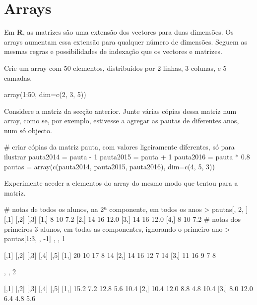\documentclass{exam}
\begin{document}
\section{Arrays}
Em \textbf{R}, as matrizes são uma extensão dos vectores para duas dimensões. Os arrays aumentam essa extensão para qualquer número de dimensões. Seguem as mesmas regras e possibilidades de indexação que os vectores e matrizes.

\begin{questions}
\question Crie um array com 50 elementos, distribuídos por 2 linhas, 3 colunas, e 5 camadas.

\begin{solution}
	\begin{rcode}
		array(1:50, dim=c(2, 3, 5))
	\end{rcode}
\end{solution}


\question Considere a matriz  da secção anterior. Junte várias cópias dessa matriz num array, como se, por exemplo, estivesse a agregar as pautas de diferentes anos, num só objecto.

\begin{solution}
	\begin{rcode}
		# criar cópias da matriz pauta, com valores ligeiramente diferentes, só para ilustrar
		pauta2014 = pauta - 1
		pauta2015 = pauta + 1
		pauta2016 = pauta * 0.8
		pautas = array(c(pauta2014, pauta2015, pauta2016), dim=c(4, 5, 3))
	\end{rcode}
\end{solution}

\question Experimente aceder a elementos do array do mesmo modo que tentou para a matriz.

\begin{solution}
	\begin{rcode}
		# notas de todos os alunos, na 2ª componente, em todos os anos
		> pautas[, 2, ]
		[,1] [,2] [,3]
		[1,]    8   10  7.2
		[2,]   14   16 12.0
		[3,]   14   16 12.0
		[4,]    8   10  7.2
		# notas dos primeiros 3 alunos, em todas as componentes, ignorando o primeiro ano
		> pautas[1:3, , -1]
		, , 1
		
		[,1] [,2] [,3] [,4] [,5]
		[1,]   20   10   17    8   14
		[2,]   14   16   12    7   14
		[3,]   11   16    9    7    8
		
		, , 2
		
		[,1] [,2] [,3] [,4] [,5]
		[1,] 15.2  7.2 12.8  5.6 10.4
		[2,] 10.4 12.0  8.8  4.8 10.4
		[3,]  8.0 12.0  6.4  4.8  5.6
	\end{rcode}
\end{solution}

\end{questions}
\end{document}
